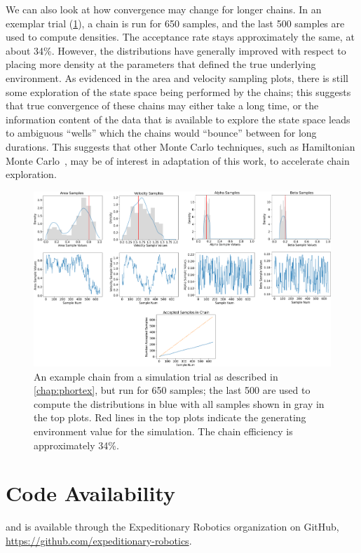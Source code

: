 We can also look at how convergence may change for longer chains. In an exemplar trial (\cref{fig:phumes_long_chain}), a chain is run for 650 samples, and the last 500 samples are used to compute densities. The acceptance rate stays approximately the same, at about 34\%. However, the distributions have generally improved with respect to placing more density at the parameters that defined the true underlying environment. As evidenced in the area and velocity sampling plots, there is still some exploration of the state space being performed by the chains; this suggests that true convergence of these chains may either take a long time, or the information content of the data that is available to explore the state space leads to ambiguous ``wells'' which the chains would ``bounce'' between for long durations. This suggests that other Monte Carlo techniques, such as Hamiltonian Monte Carlo~\autocite{duane1987hybrid}, may be of interest in adaptation of this work, to accelerate chain exploration.

\begin{figure}[h!]
    \centering
    \includegraphics[width=1\columnwidth]{figures/phumes_long_chain.png}
    \caption[\PHUMES long chain]{An example chain from a simulation trial as described in \cref{chap:phortex}, but run for 650 samples; the last 500 are used to compute the distributions in blue with all samples shown in gray in the top plots. Red lines in the top plots indicate the generating environment value for the simulation. The chain efficiency is approximately 34\%.}
    \label{fig:phumes_long_chain}
\end{figure}

\section{Code Availability}
\PHUMES and \PHORTEX is available through the Expeditionary Robotics organization on GitHub, \url{https://github.com/expeditionary-robotics}.


